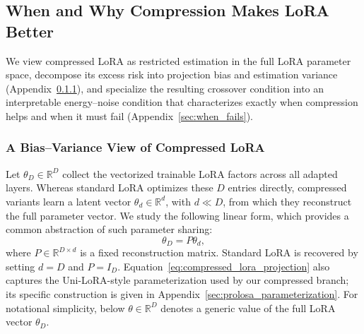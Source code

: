 \subsection{When and Why Compression Makes LoRA Better}
\label{sec:theory}

We view compressed LoRA as restricted estimation in the full LoRA parameter space, decompose its excess risk into projection bias and estimation variance (Appendix~\ref{sec:bias_variance}), and specialize the resulting crossover condition into an interpretable energy--noise condition that characterizes exactly when compression helps and when it must fail (Appendix~\ref{sec:when_fails}).

\subsubsection{A Bias--Variance View of Compressed LoRA}
\label{sec:bias_variance}

Let $\theta_D\in\mathbb{R}^D$ collect the vectorized trainable LoRA factors across all adapted layers.
Whereas standard LoRA optimizes these $D$ entries directly, compressed variants learn a latent vector $\theta_d\in\mathbb{R}^d$, with $d\ll D$, from which they reconstruct the full parameter vector.
We study the following linear form, which provides a common abstraction of such parameter sharing:
\begin{equation}
\theta_D=P\theta_d,
\label{eq:compressed_lora_projection}
\end{equation}
where $P\in\mathbb{R}^{D\times d}$ is a fixed reconstruction matrix.
Standard LoRA is recovered by setting $d=D$ and $P=I_D$.
Equation~\eqref{eq:compressed_lora_projection} also captures the Uni-LoRA-style parameterization \citep{li2025unilora} used by our compressed branch; its specific construction is given in Appendix~\ref{sec:prolosa_parameterization}.
For notational simplicity, below $\theta\in\mathbb{R}^D$ denotes a generic value of the full LoRA vector $\theta_D$.

